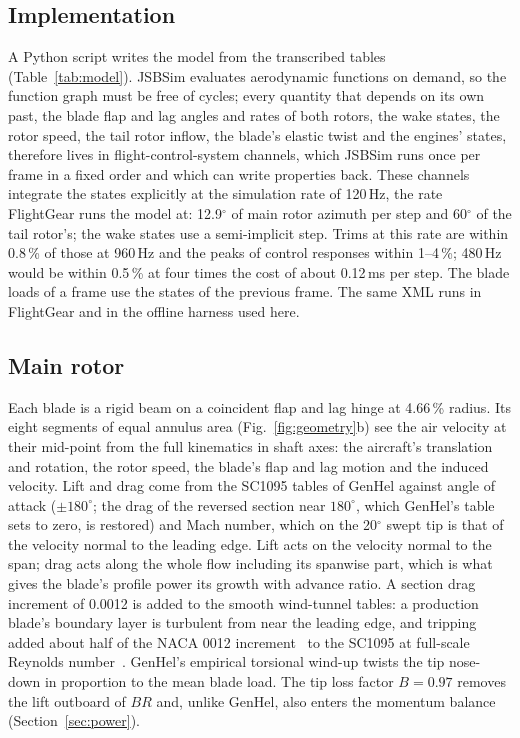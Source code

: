 \documentclass[10pt,a4paper,twocolumn]{article}
\newcommand{\Tab}[1]{}
\begin{document}
\subsection{Implementation}
A Python script writes the model from the transcribed tables (Table~\ref{tab:model}). JSBSim evaluates aerodynamic functions on
demand, so the function graph must be free of cycles; every quantity that depends on its own past, the blade flap and lag
angles and rates of both rotors, the wake states, the rotor speed, the tail rotor inflow, the blade's elastic twist and the engines' states,
therefore lives in flight-control-system channels, which JSBSim runs once per frame in a fixed order and which can write
properties back. These channels integrate the states explicitly at the simulation rate of 120\,Hz, the rate FlightGear runs
the model at: 12.9$^\circ$ of main rotor azimuth per step and 60$^\circ$ of the tail rotor's; the wake states use a semi-implicit
step. Trims at this rate are within 0.8\,\% of those at 960\,Hz and the peaks of control responses within 1--4\,\%; 480\,Hz
would be within 0.5\,\% at four times the cost of about 0.12\,ms per step. The blade loads of a frame use the states of
the previous frame. The same XML runs in FlightGear and in the offline harness used here.

\begin{table}[t]
\centering\small
\caption{The generated model: JSBSim system files, their content and the number of control-system components or named
aerodynamic functions.}\label{tab:model}
\Tab{model}
\end{table}

\subsection{Main rotor}
Each blade is a rigid beam on a coincident flap and lag hinge at 4.66\,\% radius. Its eight segments of equal annulus area
(Fig.~\ref{fig:geometry}b) see the air velocity at their mid-point from the full kinematics in shaft axes: the aircraft's
translation and rotation, the rotor speed, the blade's flap and lag motion and the induced velocity. Lift and drag come from the
SC1095 tables of GenHel against angle of attack ($\pm180^\circ$; the drag of the reversed section near $180^\circ$, which GenHel's
table sets to zero, is restored) and Mach number, which on the 20$^\circ$ swept tip is that of the velocity normal to the leading edge. Lift acts on the
velocity normal to the span; drag acts along the whole flow including its spanwise part, which is what gives the blade's profile power its
growth with advance ratio. A section drag increment of 0.0012 is added to the smooth wind-tunnel tables: a production blade's boundary layer is turbulent from
near the leading edge, and tripping added about half of the NACA 0012 increment~\cite{nacaexp} to the SC1095 at full-scale Reynolds
number~\cite{bous}. GenHel's empirical torsional wind-up twists the tip nose-down in proportion to the mean blade load.
The tip loss factor $B=0.97$ removes the lift outboard of $B R$ and, unlike GenHel, also enters the momentum balance
(Section~\ref{sec:power}).
\end{document}
